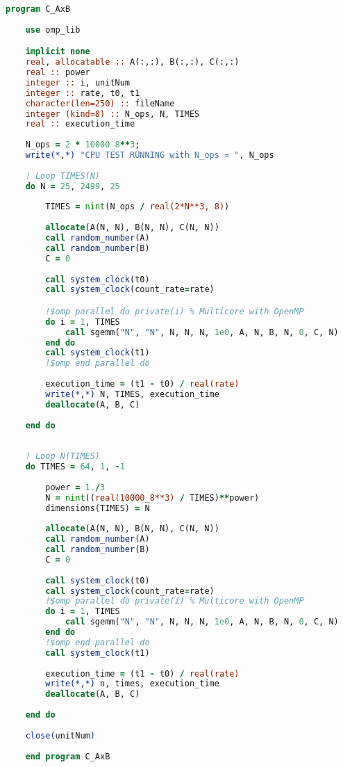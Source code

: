 \begin{lstlisting}[language=Fortran]
    program C_AxB
    
    use omp_lib

    implicit none
    real, allocatable :: A(:,:), B(:,:), C(:,:)
    real :: power
    integer :: i, unitNum
    integer :: rate, t0, t1
    character(len=250) :: fileName
    integer (kind=8) :: N_ops, N, TIMES
    real :: execution_time
    
    N_ops = 2 * 10000_8**3;
    write(*,*) "CPU TEST RUNNING with N_ops = ", N_ops
    
    ! Loop TIMES(N)
    do N = 25, 2499, 25
        
        TIMES = nint(N_ops / real(2*N**3, 8))
        
        allocate(A(N, N), B(N, N), C(N, N))
        call random_number(A)
        call random_number(B)
        C = 0
        
        call system_clock(t0)
        call system_clock(count_rate=rate)

        !$omp parallel do private(i) % Multicore with OpenMP
        do i = 1, TIMES
            call sgemm("N", "N", N, N, N, 1e0, A, N, B, N, 0, C, N)
        end do
        call system_clock(t1)
        !$omp end parallel do
        
        execution_time = (t1 - t0) / real(rate)
        write(*,*) N, TIMES, execution_time
        deallocate(A, B, C)
        
    end do
    
    
    ! Loop N(TIMES)
    do TIMES = 64, 1, -1
        
        power = 1./3
        N = nint((real(10000_8**3) / TIMES)**power)
        dimensions(TIMES) = N
        
        allocate(A(N, N), B(N, N), C(N, N))
        call random_number(A)
        call random_number(B)
        C = 0
        
        call system_clock(t0)
        call system_clock(count_rate=rate)
        !$omp parallel do private(i) % Multicore with OpenMP
        do i = 1, TIMES
            call sgemm("N", "N", N, N, N, 1e0, A, N, B, N, 0, C, N)
        end do
        !$omp end parallel do
        call system_clock(t1)
        
        execution_time = (t1 - t0) / real(rate)
        write(*,*) n, times, execution_time
        deallocate(A, B, C)
        
    end do
    
    close(unitNum)
    
    end program C_AxB

\end{lstlisting}


